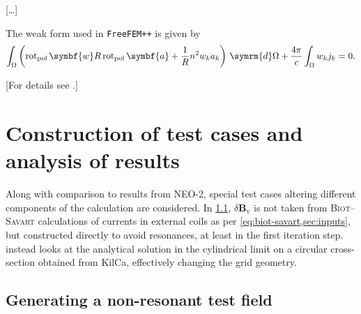 \documentclass[a4paper, twoside, 10pt, english]{article}
\numberwithin{equation}{section}
\let\vec\symbf
\newcommand*\diff{\ensuremath{\symrm{d}}}  %
\newcommand*\pol{\ensuremath{\textrm{pol}}}  %
\newcommand*\polCurl{\ensuremath{\operatorname{rot}_{\pol}}}  %
\newcommand*\Bvac{\ensuremath{\delta \vec{B}_{\text{v}}}}  %
\begin{document}
[\ldots]

The weak form used in \texttt{FreeFEM++} is given by  %
\begin{gather}
  \int_{\Omega} \left ( \polCurl \vec{w} R \polCurl \vec{a} + \frac{1}{R} n^{2} w_{k} a_{k} \right ) \, \diff \Omega + \frac{4 \pi}{c} \int_{\Omega} w_{k} j_{k} = 0.
\end{gather}

[For details see \cite{Albert19,Biro15,Hecht12,Jin02}.]

\clearpage
\section{Construction of test cases and analysis of results}

Along with comparison to results from NEO-2, special test cases altering different components of the calculation are considered. In \cref{sec:nonres}, $\Bvac$ is not taken from \textsc{Biot}--\textsc{Savart} calculations of currents in external coils as per \cref{eq:biot-savart,sec:inputs}, but constructed directly to avoid resonances, at least in the first iteration step.  instead looks at the analytical solution in the cylindrical limit on a circular cross-section obtained from KilCa, effectively changing the grid geometry.

\subsection{Generating a non-resonant test field}
\label{sec:nonres}
\end{document}
